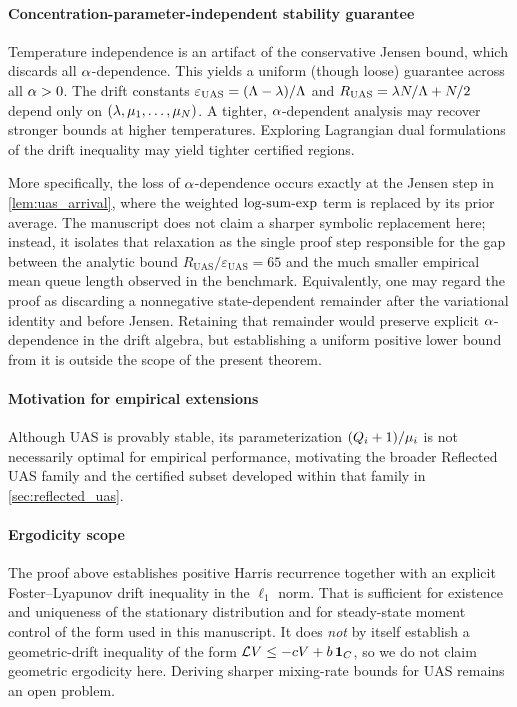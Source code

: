 \paragraph{Concentration-parameter-independent stability guarantee}
Temperature independence is an artifact of the conservative Jensen bound, which discards all $\alpha$-dependence. This yields a uniform (though loose) guarantee across all $\alpha > 0$. The drift constants $\varepsilon_{\mathrm{UAS}} = (\Lambda - \lambda)/\Lambda$ and $R_{\mathrm{UAS}} = \lambda N/\Lambda + N/2$ depend only on $(\lambda, \mu_1, \dots, \mu_N)$. A tighter, $\alpha$-dependent analysis may recover stronger bounds at higher temperatures. Exploring Lagrangian dual formulations of the drift inequality may yield tighter certified regions.

More specifically, the loss of $\alpha$-dependence occurs exactly at the Jensen step in \cref{lem:uas_arrival}, where the weighted $\mathrm{log\text{-}sum\text{-}exp}$ term is replaced by its prior average. The manuscript does not claim a sharper symbolic replacement here; instead, it isolates that relaxation as the single proof step responsible for the gap between the analytic bound $R_{\mathrm{UAS}}/\varepsilon_{\mathrm{UAS}}=65$ and the much smaller empirical mean queue length observed in the benchmark.
Equivalently, one may regard the proof as discarding a nonnegative state-dependent remainder after the variational identity and before Jensen. Retaining that remainder would preserve explicit $\alpha$-dependence in the drift algebra, but establishing a uniform positive lower bound from it is outside the scope of the present theorem.

\paragraph{Motivation for empirical extensions}
Although UAS is provably stable, its parameterization $(Q_{i}+1)/\mu_i$ is not necessarily optimal for empirical performance, motivating the broader Reflected UAS family and the certified subset developed within that family in \cref{sec:reflected_uas}.

\paragraph{Ergodicity scope}
The proof above establishes positive Harris recurrence together with an explicit Foster--Lyapunov drift inequality in the $\ell_1$ norm. That is sufficient for existence and uniqueness of the stationary distribution and for steady-state moment control of the form used in this manuscript. It does \emph{not} by itself establish a geometric-drift inequality of the form $\mathcal{L} V \leq -cV + b\,\mathbf{1}_C$, so we do not claim geometric ergodicity here. Deriving sharper mixing-rate bounds for UAS remains an open problem.
